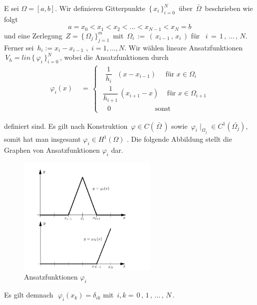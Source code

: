 \newpage
\begin{Beispiel} 
E sei $\Omega = [a,b]$. Wir definieren Gitterpunkte $\, \{ \, x_i \, \}_{i=0}^{N} \, $ über $\, \bar\Omega \, $  beschrieben wie folgt
\begin{equation*}
a = x_0 < x_1 < x_2 < \dots < x_{N-1} < x_N = b
\end{equation*}
und eine Zerlegung  $\, Z= \, \{ \, \Omega_j  \, \}_{j=1}^{m} \, $ mit $ \, \Omega_i \, := \,  ( \, x_{i-1} \, , \, x_i \,)$ für $\, \, \, i \, = \,1 \, , \, \dots \, , \, N$. 
Ferner sei $\, h_i := x_i - x_{i-1} \, \, , \, \,  i=1,\dots,N$. Wir wählen lineare Ansatzfunktionen $ \, V_h=lin \, \{ \, \varphi_i \, \}_{i=0}^{N} \,$, wobei die Ansatzfunktionen durch
\begin{equation*}
\begin{aligned}
\varphi_i(x) \, \, &= \, 
\begin{cases}
\, \, \, \, \dfrac{1}{h_i} \, \, \, \, (x-x_{i-1})   \, \, \, \, \, \,  \text{ für } x \in \Omega_i \\
\, \, \dfrac{1}{h_{i+1}} \, (x_{i+1}-x) \, \, \, \, \, \text{ für } x \in \Omega_{i+1}  \\
\, \, \, \, \, \,  0 \, \, \, \, \, \, \, \, \,  \, \, \, \, \, \, \, \, \, \, \, \, \, \, \, \, \, \, \, \, \, \, \, \, \, \, \, \text{ sonst }
\end{cases}
\end{aligned}
\end{equation*}

definiert sind. Es gilt nach Konstruktion $\, \varphi \in C(\, \bar{\Omega} \, )$ sowie $\, \varphi_{i}\mid_{\Omega_{j}} \in C^{1}(\bar{\Omega_{j}})$, somit hat man insgesamt $\varphi_i \in H^{1}(\Omega)$ \cite[184]{Numerik}.
Die folgende Abbildung stellt die Graphen von Ansatzfunktionen $\varphi_i$ dar.

\begin{figure}[ht]
	\centering
  \includegraphics[width=0.6\textwidth]{hatfunction.png}
	\caption{Ansatzfunktionen $\varphi_i$ \cite[184]{Numerik}}
	\label{fig:hat}
\end{figure}

Es gilt demnach $\, \, \varphi_i (x_k) = \delta_{ik}$ mit  $\, i  ,  k = \, 0 \, , \, 1 \, , \, \dots \,, \,N \,$.
\end{Beispiel}

